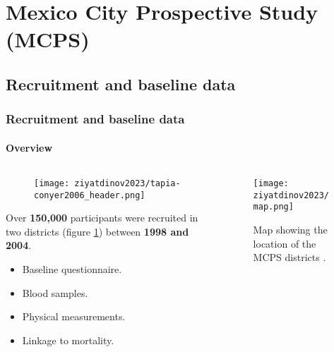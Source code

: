 
% 

\section{Mexico City Prospective Study (MCPS)}

\subsection{Recruitment and baseline data}
\begin{frame}
    \frametitle{Recruitment and baseline data}
    \framesubtitle{Overview}

    \begin{columns}

    \begin{column}{0.5\textwidth}

        \begin{figure}[htpb]
            \centering
            \texttt{[image: ziyatdinov2023/tapia-conyer2006\_header.png]}
        \end{figure}

        Over \textbf{\color{complement-1} 150,000} participants were recruited in two districts (figure \ref{fig:mcps-main-map}) between \textbf{\color{complement-2} 1998 and 2004}.

        \begin{itemize}[label=$\bullet$,noitemsep,topsep=5pt]
            \item Baseline questionnaire.
            \item Blood samples.
            \item Physical measurements.
            \item Linkage to mortality.
        \end{itemize}

    \end{column}

    \begin{column}{0.5\textwidth}
        \begin{figure}[htpb]
            \centering
            \texttt{[image: ziyatdinov2023/map.png]}
            \caption{Map showing the location of the MCPS districts \parencite{tapia-conyer-2006}.}
            \label{fig:mcps-main-map}
        \end{figure}
    \end{column}
    \end{columns}
\end{frame}


